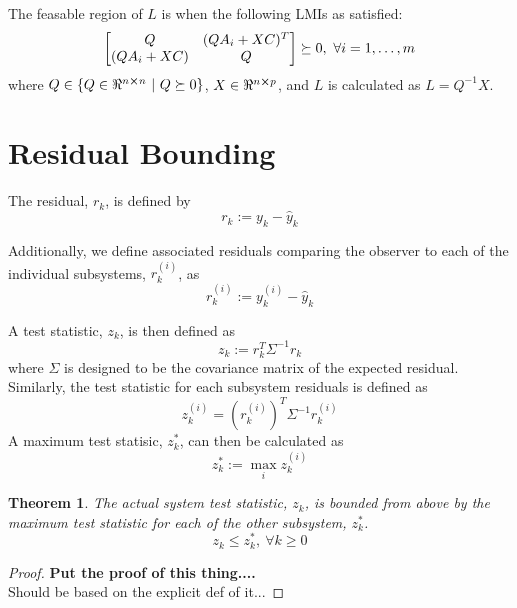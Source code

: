 \documentclass[]{article}
\newtheorem{theorem}{Theorem}
\begin{document}
The feasable region of $L$ is when the following LMIs as satisfied:
\begin{equation}\label{eq:L_feasable_LMIs}
    \mqty[
        Q &(Q A_i + X C)^T\\
        (Q A_i + X C) & Q
        ] \succeq 0, \ \forall i = 1, \dots, m
\end{equation}
where $Q \in \{Q \in \real^{n \cross n} \ | \ Q \succeq 0\}$, $X \in \real^{n \cross p}$, 
and $L$ is calculated as $L = Q^{-1} X$.

\section{Residual Bounding}
The residual, $r_k$, is defined by
\begin{equation}\label{eq:r_k_def}
    r_k := y_k - \hat{y}_k
\end{equation}

Additionally, we define associated residuals comparing the observer to each of the 
individual subsystems, $r_k^{(i)}$, as
\begin{equation}
    r_k^{(i)} := y_k^{(i)} - \hat{y}_k
\end{equation}

A test statistic, $z_k$, is then defined as
\begin{equation}\label{eq:z_k_def}
    z_k := r_k^T \Sigma^{-1} r_k
\end{equation}
where $\Sigma$ is designed to be the covariance matrix of the expected residual. 
Similarly, the test statistic for each subsystem residuals is defined as
\begin{equation}
    z_k^{(i)} = (r_k^{(i)})^T \Sigma^{-1} r_k^{(i)}  
\end{equation}
A maximum test statisic, $z_k^*$, can then be calculated as
\begin{equation}
    z_k^* := \max_i z_k^{(i)}
\end{equation}

\begin{theorem}
    The actual system test statistic, $z_k$, is bounded from above by the maximum 
    test statistic for each of the other subsystem, $z_k^*$.
    \begin{equation}
        z_k \leq z_k^*, \ \forall k \geq 0
    \end{equation}
\end{theorem}

\begin{proof}
    \textbf{Put the proof of this thing....}\\
    Should be based on the explicit def of it...
\end{proof}
\end{document}
